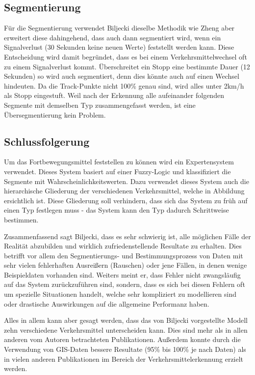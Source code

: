 \subsection{Segmentierung}
Für die Segmentierung verwendet Biljecki dieselbe Methodik wie Zheng aber erweitert diese dahingehend, dass auch dann segmentiert wird, wenn ein Signalverlust (30 Sekunden keine neuen Werte) feststellt werden kann. Diese Entscheidung wird damit begründet, dass es bei einem Verkehrsmittelwechsel oft zu einem Signalverlust kommt. 
Überschreitet ein Stopp eine bestimmte Dauer (12 Sekunden) so wird auch segmentiert, denn dies könnte auch auf einen Wechsel hindeuten. Da die Track-Punkte nicht 100\% genau sind, wird alles unter 2km/h als Stopp eingestuft. Weil nach der Erkennung alle aufeinander folgenden Segmente mit demselben Typ zusammengefasst werden, ist eine Übersegmentierung kein Problem.

\subsection{Schlussfolgerung}
Um das Fortbewegungsmittel feststellen zu können wird ein Expertensystem verwendet. Dieses System basiert auf einer Fuzzy-Logic und klassifiziert die Segmente mit Wahrscheinlichkeitswerten. Dazu verwendet dieses System auch die hierarchische Gliederung der verschiedenen Verkehrsmittel, welche in Abbildung  ersichtlich ist. Diese Gliederung soll verhindern, dass sich das System zu früh auf einen Typ festlegen muss - das System kann den Typ dadurch Schrittweise bestimmen.


Zusammenfassend sagt Biljecki, dass es sehr schwierig ist, alle möglichen Fälle der Realität abzubilden und wirklich zufriedenstellende Resultate zu erhalten. Dies betrifft vor allem den Segmentierungs- und Bestimmungsprozess von Daten mit sehr vielen fehlerhaften Ausreißern (Rauschen) oder jene Fällen, in denen wenige Beispieldaten vorhanden sind. Weiters meint er, dass Fehler nicht zwangsläufig auf das System zurückzuführen sind, sondern, dass es sich bei diesen Fehlern oft um spezielle Situationen handelt, welche sehr kompliziert zu modellieren sind oder drastische Auswirkungen auf die allgemeine Performanz haben.

Alles in allem kann aber gesagt werden, dass das von Biljecki vorgestellte Modell zehn verschiedene Verkehrsmittel unterscheiden kann. Dies sind mehr als in allen anderen vom Autoren betrachteten Publikationen. Außerdem konnte durch die Verwendung von GIS-Daten bessere Resultate (95\% bis 100\% je nach Daten) als in vielen anderen Publikationen im Bereich der Verkehrsmittelerkennung erzielt werden. 

